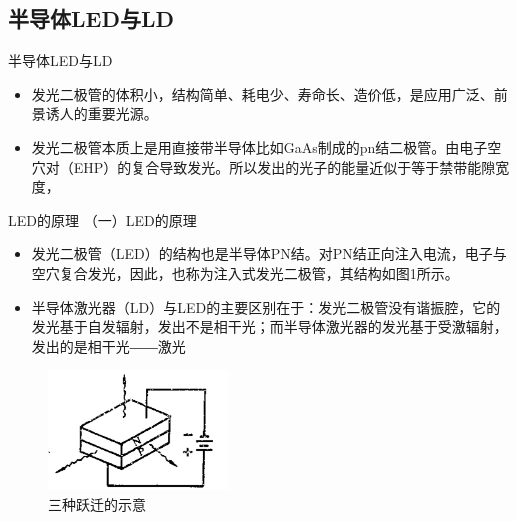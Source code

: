 \documentclass[trans]{beamer} %
\begin{document}
\subsection{半导体LED与LD} 
 
\begin{frame}{半导体LED与LD}

    \begin{itemize}
        \item 发光二极管的体积小，结构简单、耗电少、寿命长、造价低，是应用广泛、前景诱人的重要光源。
         \item 发光二极管本质上是用直接带半导体比如GaAs制成的pn结二极管。由电子空穴对（EHP）的复合导致发光。所以发出的光子的能量近似于等于禁带能隙宽度， 
    \end{itemize}
 \end{frame}

\begin{frame}{LED的原理}
（一）LED的原理
    \begin{itemize}
        \item 发光二极管（LED）的结构也是半导体PN结。对PN结正向注入电流，电子与空穴复合发光，因此，也称为注入式发光二极管，其结构如图1所示。
         \item 半导体激光器（LD）与LED的主要区别在于：发光二极管没有谐振腔，它的发光基于自发辐射，发出不是相干光；而半导体激光器的发光基于受激辐射，发出的是相干光――激光 

    \end{itemize}
    \begin{figure}[htbp] 
    \centering\includegraphics[height=1.25in]{source/ch2/fg223.png} 
    \caption{三种跃迁的示意}
    \end{figure}  
 \end{frame}
 
\end{document}
